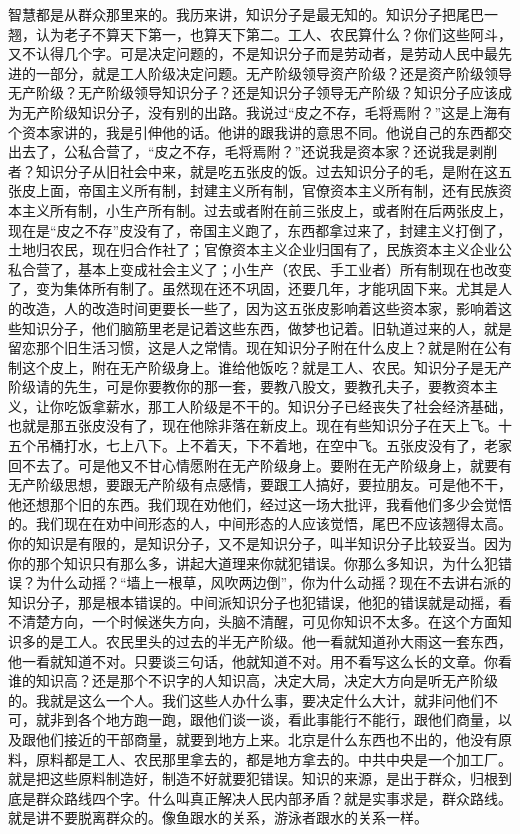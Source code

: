 智慧都是从群众那里来的。我历来讲，知识分子是最无知的。知识分子把尾巴一翘，认为老子不算天下第一，也算天下第二。工人、农民算什么？你们这些阿斗，又不认得几个字。可是决定问题的，不是知识分子而是劳动者，是劳动人民中最先进的一部分，就是工人阶级决定问题。无产阶级领导资产阶级？还是资产阶级领导无产阶级？无产阶级领导知识分子？还是知识分子领导无产阶级？知识分子应该成为无产阶级知识分子，没有别的出路。我说过“皮之不存，毛将焉附？”这是上海有个资本家讲的，我是引伸他的话。他讲的跟我讲的意思不同。他说自己的东西都交出去了，公私合营了，“皮之不存，毛将焉附？”还说我是资本家？还说我是剥削者？知识分子从旧社会中来，就是吃五张皮的饭。过去知识分子的毛，是附在这五张皮上面，帝国主义所有制，封建主义所有制，官僚资本主义所有制，还有民族资本主义所有制，小生产所有制。过去或者附在前三张皮上，或者附在后两张皮上，现在是“皮之不存”皮没有了，帝国主义跑了，东西都拿过来了，封建主义打倒了，土地归农民，现在归合作社了；官僚资本主义企业归国有了，民族资本主义企业公私合营了，基本上变成社会主义了；小生产（农民、手工业者）所有制现在也改变了，变为集体所有制了。虽然现在还不巩固，还要几年，才能巩固下来。尤其是人的改造，人的改造时间更要长一些了，因为这五张皮影响着这些资本家，影响着这些知识分子，他们脑筋里老是记着这些东西，做梦也记着。旧轨道过来的人，就是留恋那个旧生活习惯，这是人之常情。现在知识分子附在什么皮上？就是附在公有制这个皮上，附在无产阶级身上。谁给他饭吃？就是工人、农民。知识分子是无产阶级请的先生，可是你要教你的那一套，要教八股文，要教孔夫子，要教资本主义，让你吃饭拿薪水，那工人阶级是不干的。知识分子已经丧失了社会经济基础，也就是那五张皮没有了，现在他除非落在新皮上。现在有些知识分子在天上飞。十五个吊桶打水，七上八下。上不着天，下不着地，在空中飞。五张皮没有了，老家回不去了。可是他又不甘心情愿附在无产阶级身上。要附在无产阶级身上，就要有无产阶级思想，要跟无产阶级有点感情，要跟工人搞好，要拉朋友。可是他不干，他还想那个旧的东西。我们现在劝他们，经过这一场大批评，我看他们多少会觉悟的。我们现在在劝中间形态的人，中间形态的人应该觉悟，尾巴不应该翘得太高。你的知识是有限的，是知识分子，又不是知识分子，叫半知识分子比较妥当。因为你的那个知识只有那么多，讲起大道理来你就犯错误。你那么多知识，为什么犯错误？为什么动摇？“墙上一根草，风吹两边倒”，你为什么动摇？现在不去讲右派的知识分子，那是根本错误的。中间派知识分子也犯错误，他犯的错误就是动摇，看不清楚方向，一个时候迷失方向，头脑不清醒，可见你知识不太多。在这个方面知识多的是工人。农民里头的过去的半无产阶级。他一看就知道孙大雨这一套东西，他一看就知道不对。只要谈三句话，他就知道不对。用不看写这么长的文章。你看谁的知识高？还是那个不识字的人知识高，决定大局，决定大方向是听无产阶级的。我就是这么一个人。我们这些人办什么事，要决定什么大计，就非问他们不可，就非到各个地方跑一跑，跟他们谈一谈，看此事能行不能行，跟他们商量，以及跟他们接近的干部商量，就要到地方上来。北京是什么东西也不出的，他没有原料，原料都是工人、农民那里拿去的，都是地方拿去的。中共中央是一个加工厂。就是把这些原料制造好，制造不好就要犯错误。知识的来源，是出于群众，归根到底是群众路线四个字。什么叫真正解决人民内部矛盾？就是实事求是，群众路线。就是讲不要脱离群众的。像鱼跟水的关系，游泳者跟水的关系一样。

